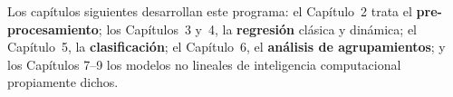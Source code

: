 Los capítulos siguientes desarrollan este programa: el Capítulo~2 trata
el \textbf{pre-procesamiento}; los Capítulos~3 y~4, la \textbf{regresión}
clásica y dinámica; el Capítulo~5, la \textbf{clasificación}; el
Capítulo~6, el \textbf{análisis de agrupamientos}; y los Capítulos 7--9
los modelos no lineales de inteligencia computacional propiamente dichos.


